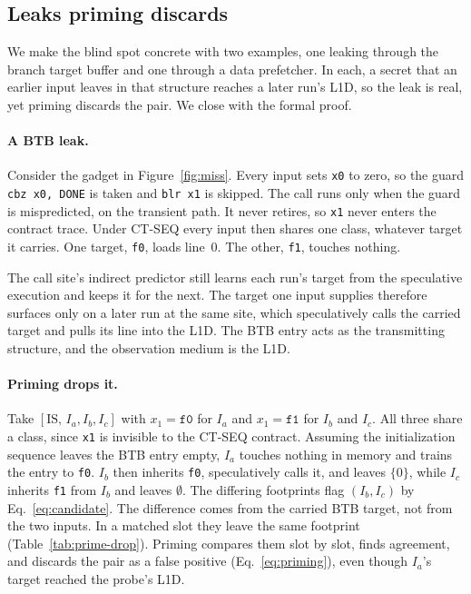 \documentclass[letterpaper,twocolumn,10pt]{article}
\theoremstyle{definition}
\providecommand{\IS}{\ensuremath{\mathrm{IS}}}
\providecommand{\batch}[1]{\ensuremath{[\IS,\,#1]}}
\begin{document}
\subsection{Leaks priming discards}
\label{sec:detect-gap}

We make the blind spot concrete with two examples, one leaking through the branch target buffer and
one through a data prefetcher. In each, a secret that an earlier input leaves in that structure
reaches a later run's L1D, so the leak is real, yet priming discards the pair. We close with the
formal proof.

\paragraph{A BTB leak.}
Consider the gadget in Figure~\ref{fig:miss}. Every input sets \texttt{x0} to zero, so the guard
\texttt{cbz x0, DONE} is taken and \texttt{blr x1} is skipped. The call runs only when the guard is
mispredicted, on the transient path. It never retires, so \texttt{x1} never enters the contract
trace. Under \textsc{CT-SEQ} every input then shares one class, whatever target it carries. One
target, \texttt{f0}, loads line~$0$. The other, \texttt{f1}, touches nothing.

The call site's indirect predictor still learns each run's target from the speculative execution
and keeps it for the next. The target one input supplies therefore surfaces only on a later run at
the same site, which speculatively calls the carried target and pulls its line into the L1D. The
BTB entry acts as the transmitting structure, and the observation medium is the L1D.



\paragraph{Priming drops it.}
Take $\batch{I_a,I_b,I_c}$ with $x_1=\texttt{f0}$ for $I_a$ and $x_1=\texttt{f1}$ for $I_b$ and
$I_c$. All three share a class, since \texttt{x1} is invisible to the CT-SEQ contract. Assuming the
initialization sequence leaves the BTB entry empty, $I_a$ touches nothing in memory and
trains the entry to \texttt{f0}. $I_b$ then inherits \texttt{f0}, speculatively calls it, and leaves
$\{0\}$, while $I_c$ inherits \texttt{f1} from $I_b$ and leaves $\emptyset$. The differing footprints flag
$(I_b,I_c)$ by Eq.~\eqref{eq:candidate}. The difference comes from the carried BTB target, not from
the two inputs. In a matched slot they leave the same footprint (Table~\ref{tab:prime-drop}).
Priming compares them slot by slot, finds agreement, and discards the pair as a false positive
(Eq.~\eqref{eq:priming}), even though $I_a$'s target reached the probe's L1D.
\end{document}
